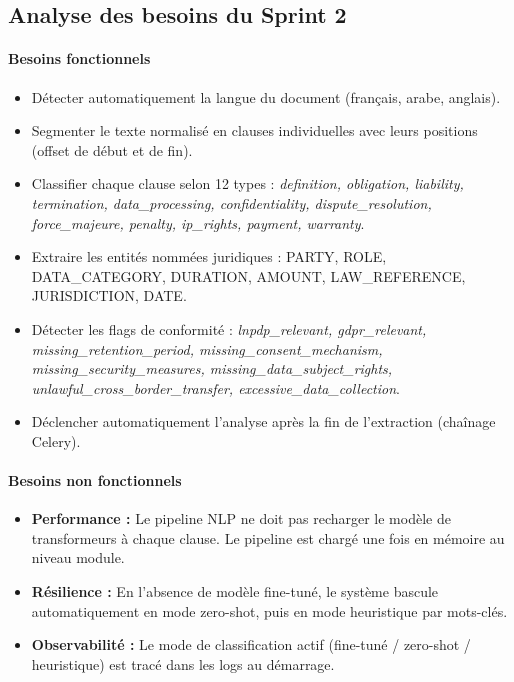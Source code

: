 \subsection{Analyse des besoins du Sprint 2}

\paragraph{Besoins fonctionnels}
\begin{itemize}
    \item Détecter automatiquement la langue du document (français, arabe, anglais).
    \item Segmenter le texte normalisé en clauses individuelles avec leurs positions (offset de début et de fin).
    \item Classifier chaque clause selon 12 types : \textit{definition, obligation, liability, termination, data\_processing, confidentiality, dispute\_resolution, force\_majeure, penalty, ip\_rights, payment, warranty}.
    \item Extraire les entités nommées juridiques : PARTY, ROLE, DATA\_CATEGORY, DURATION, AMOUNT, LAW\_REFERENCE, JURISDICTION, DATE.
    \item Détecter les flags de conformité : \textit{lnpdp\_relevant, gdpr\_relevant, missing\_retention\_period, missing\_consent\_mechanism, missing\_security\_measures, missing\_data\_subject\_rights, unlawful\_cross\_border\_transfer, excessive\_data\_collection}.
    \item Déclencher automatiquement l'analyse après la fin de l'extraction (chaînage Celery).
\end{itemize}

\paragraph{Besoins non fonctionnels}
\begin{itemize}
    \item \textbf{Performance :} Le pipeline NLP ne doit pas recharger le modèle de transformeurs à chaque clause. Le pipeline est chargé une fois en mémoire au niveau module.
    \item \textbf{Résilience :} En l'absence de modèle fine-tuné, le système bascule automatiquement en mode zero-shot, puis en mode heuristique par mots-clés.
    \item \textbf{Observabilité :} Le mode de classification actif (fine-tuné / zero-shot / heuristique) est tracé dans les logs au démarrage.
\end{itemize}

